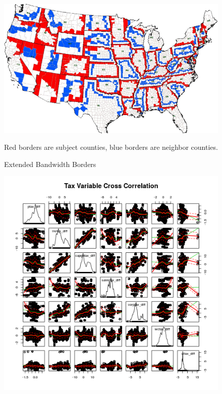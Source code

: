 \documentclass[12pt,a4paper]{article}
\begin{document}
\begin{figure}[h]
    \centering
    \caption{Extended Bandwidth Borders}\par\medskip
            \begin{minipage}{0.70\textwidth}
    \includegraphics[scale = 0.5]{../analysis/output/eb_picture.png}
    {\footnotesize Red borders are subject counties, blue borders are neighbor counties. \par}
    \end{minipage}
\end{figure}



\begin{figure}[h]\label{pairs}
    \centering
    \includegraphics[scale = 0.5]{../analysis/output/_--_pairs.png}
\end{figure}
\end{document}
